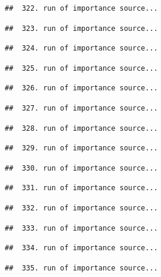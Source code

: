 \documentclass[
]{article}
\begin{document}
\begin{verbatim}
##  322. run of importance source...
\end{verbatim}

\begin{verbatim}
##  323. run of importance source...
\end{verbatim}

\begin{verbatim}
##  324. run of importance source...
\end{verbatim}

\begin{verbatim}
##  325. run of importance source...
\end{verbatim}

\begin{verbatim}
##  326. run of importance source...
\end{verbatim}

\begin{verbatim}
##  327. run of importance source...
\end{verbatim}

\begin{verbatim}
##  328. run of importance source...
\end{verbatim}

\begin{verbatim}
##  329. run of importance source...
\end{verbatim}

\begin{verbatim}
##  330. run of importance source...
\end{verbatim}

\begin{verbatim}
##  331. run of importance source...
\end{verbatim}

\begin{verbatim}
##  332. run of importance source...
\end{verbatim}

\begin{verbatim}
##  333. run of importance source...
\end{verbatim}

\begin{verbatim}
##  334. run of importance source...
\end{verbatim}

\begin{verbatim}
##  335. run of importance source...
\end{verbatim}
\end{document}
